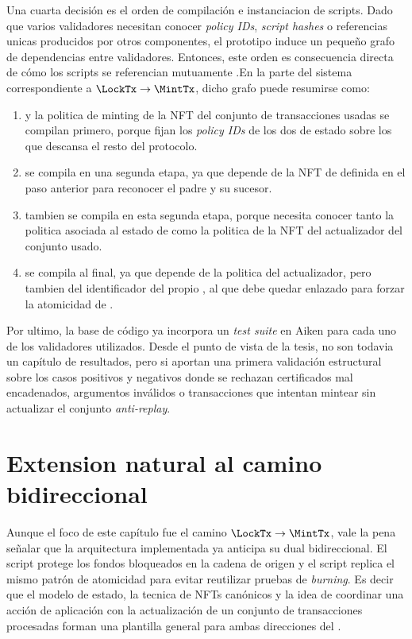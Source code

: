 Una cuarta decisión es el orden de compilación e instanciacion de scripts. Dado que varios validadores necesitan conocer \textit{policy IDs}, \textit{script hashes} o referencias unicas producidos por otros componentes, el prototipo induce un pequeño grafo de dependencias entre validadores. Entonces, este orden es consecuencia directa de cómo los scripts se referencian mutuamente .En la parte del sistema correspondiente a $\LockTx \rightarrow \MintTx$, dicho grafo puede resumirse como:

\begin{enumerate}[noitemsep]
  \item \StakeDistributionMintValidator y la politica de minting de la NFT del conjunto de transacciones usadas se compilan primero, porque fijan los \textit{policy IDs} de los dos \UTxOs de estado sobre los que descansa el resto del protocolo.
  \item \StakeDistributionSpendValidator se compila en una segunda etapa, ya que depende de la NFT de \StakeDistribution definida en el paso anterior para reconocer el \UTxO padre y su sucesor.
  \item \MintingValidator tambien se compila en esta segunda etapa, porque necesita conocer tanto la politica asociada al estado de \StakeDistribution como la politica de la NFT del actualizador del conjunto usado.
  \item \TxsUpdaterMintingValidator se compila al final, ya que depende de la politica del actualizador, pero tambien del identificador del propio \MintingValidator, al que debe quedar enlazado para forzar la atomicidad de \MintTx.
\end{enumerate}

Por ultimo, la base de código ya incorpora un \textit{test suite} en Aiken para cada uno de los validadores utilizados. Desde el punto de vista de la tesis, no son todavia un capítulo de resultados, pero si aportan una primera validación estructural sobre los casos positivos y negativos donde se rechazan certificados mal encadenados, argumentos \ZK inválidos o transacciones que intentan mintear sin actualizar el conjunto \textit{anti-replay}.

\section{Extension natural al camino bidireccional}

Aunque el foco de este capítulo fue el camino $\LockTx \rightarrow \MintTx$, vale la pena señalar que la arquitectura implementada ya anticipa su dual bidireccional. El script \UnlockingValidator protege los fondos bloqueados en la cadena de origen y el script \TxsUpdaterUnlockingValidator replica el mismo patrón de atomicidad para evitar reutilizar pruebas de \textit{burning}. Es decir que el modelo de estado, la tecnica de NFTs canónicos y la idea de coordinar una acción de aplicación con la actualización de un conjunto de transacciones procesadas forman una plantilla general para ambas direcciones del \zkBridge.

